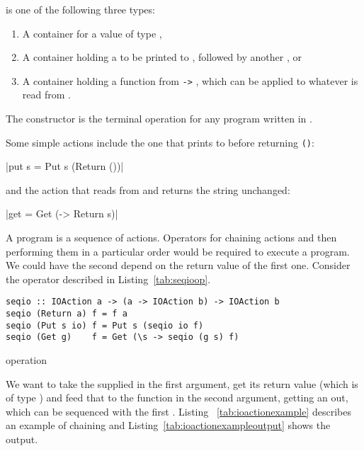 \documentclass[thesis-solanki.tex]{subfiles}
\begin{document}
 is one of the following three types:
\begin{enumerate}
\item A container for a value of type ,

\item A container holding a  to be printed to ,
  followed by another , or

\item A container holding a function from  \Verb!->! , which can be applied
  to whatever  is read from . 
\end{enumerate}

The  constructor is the terminal operation for any program written in . 

Some simple actions include the one that prints to  before returning \Verb!()!:

|put s = Put s (Return ())|

and the action that reads from  and returns the string unchanged:

|get = Get (\s -> Return s)|

A program is a sequence of actions. Operators for chaining actions and then performing them in a particular order would be required to execute
a program. We could have the second  depend on the return value of the first one. Consider the 
operator described in Listing~\ref{tab:seqioop}.

\begin{code-list}[H]
\begin{singlespace}
\begin{verbatim}
seqio :: IOAction a -> (a -> IOAction b) -> IOAction b
seqio (Return a) f = f a
seqio (Put s io) f = Put s (seqio io f)
seqio (Get g)    f = Get (\s -> seqio (g s) f)
\end{verbatim}
\end{singlespace}
\caption{ operation}
\label{tab:seqioop}
\end{code-list}


We want to take the   supplied in the first argument, get its return value (which is of type 
) and feed that to the function in 
the second argument, getting an   out, which can be sequenced with the first  
. Listing ~\ref{tab:ioactionexample} describes an example of chaining  and 
Listing~\ref{tab:ioactionexampleoutput} shows the output.
\end{document}
